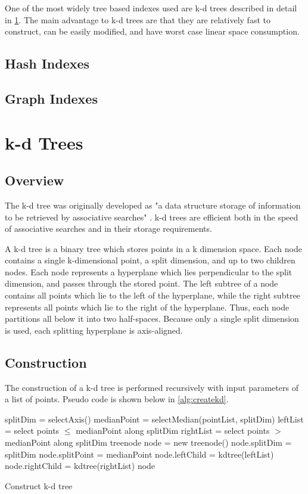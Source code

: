 One of the most widely tree based indexes used are k-d trees described in detail in \ref{sec:kdtree}.  The main advantage to k-d trees are that they are relatively fast to construct, can be easily modified, and have worst case linear space consumption.

\subsection{Hash Indexes}


\subsection{Graph Indexes}


\section{k-d Trees}
\label{sec:kdtree}

\subsection{Overview}
The k-d tree was originally developed as "a data structure storage of information to be retrieved by associative searches" \citep{bentley1975multidimensional}. k-d trees are efficient both in the speed of associative searches and in their storage requirements.

A k-d tree is a binary tree which stores points in a k dimension space.  Each node contains a single k-dimensional point, a split dimension, and up to two children nodes.  Each node represents a hyperplane which lies perpendicular to the split dimension, and passes through the stored point.  The left subtree of a node contains all points which lie to the left of the hyperplane, while the right subtree represents all points which lie to the right of the hyperplane.  Thus, each node partitions all below it into two half-spaces.  Because only a single split dimension is used, each splitting hyperplane is axis-aligned.

\subsection{Construction}

The construction of a k-d tree is performed recursively with input parameters of a list of points.  Pseudo code is shown below in \ref{alg:createkd}.  

\begin{algorithm}
\begin{algorithmic}
	\State splitDim = selectAxis()
	\State
	\State medianPoint = selectMedian(pointList, splitDim)
	\State leftList = select points $\leq$ medianPoint along splitDim
	\State rightList = select points $>$ medianPoint along splitDim
	\State
	\State treenode node = new treenode()
	\State node.splitDim = splitDim
	\State node.splitPoint = medianPoint
	\State node.leftChild = kdtree(leftList)
	\State node.rightChild = kdtree(rightList)
	\State
	\State \Return node
\EndFunction
\end{algorithmic}
\caption{Construct k-d tree}
\label{alg:createkd}
\end{algorithm}


